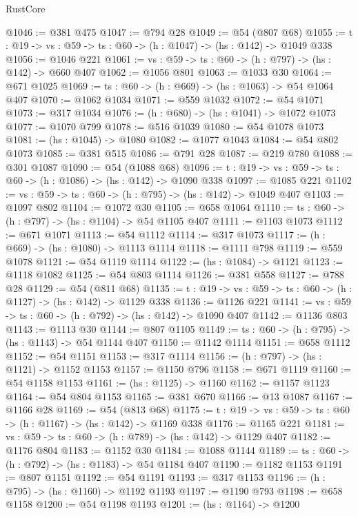 \begin{lexlean}{RustCore}
\begin{coremodule}
@1046 := @381 @475
@1047 := @794 @28
@1049 := @54 (@807 @68)
@1055 := {t : @19} -> {vs : @59} -> {ts : @60} -> (h : @1047) -> (hs : @142) -> @1049 @338
@1056 := @1046 @221
@1061 := {vs : @59} -> {ts : @60} -> (h : @797) -> (hs : @142) -> @660 @407
@1062 := @1056 @801
@1063 := @1033 @30
@1064 := @671 @1025
@1069 := {ts : @60} -> (h : @669) -> (hs : @1063) -> @54 @1064 @407
@1070 := @1062 @1034
@1071 := @559 @1032
@1072 := @54 @1071
@1073 := @317 @1034
@1076 := (h : @680) -> (hs : @1041) -> @1072 @1073
@1077 := @1070 @799
@1078 := @516 @1039
@1080 := @54 @1078 @1073
@1081 := (hs : @1045) -> @1080
@1082 := @1077 @1043
@1084 := @54 @802 @1073
@1085 := @381 @515
@1086 := @791 @28
@1087 := @219 @780
@1088 := @301 @1087
@1090 := @54 (@1088 @68)
@1096 := {t : @19} -> {vs : @59} -> {ts : @60} -> (h : @1086) -> (hs : @142) -> @1090 @338
@1097 := @1085 @221
@1102 := {vs : @59} -> {ts : @60} -> (h : @795) -> (hs : @142) -> @1049 @407
@1103 := @1097 @802
@1104 := @1072 @30
@1105 := @658 @1064
@1110 := {ts : @60} -> (h : @797) -> (hs : @1104) -> @54 @1105 @407
@1111 := @1103 @1073
@1112 := @671 @1071
@1113 := @54 @1112
@1114 := @317 @1073
@1117 := (h : @669) -> (hs : @1080) -> @1113 @1114
@1118 := @1111 @798
@1119 := @559 @1078
@1121 := @54 @1119 @1114
@1122 := (hs : @1084) -> @1121
@1123 := @1118 @1082
@1125 := @54 @803 @1114
@1126 := @381 @558
@1127 := @788 @28
@1129 := @54 (@811 @68)
@1135 := {t : @19} -> {vs : @59} -> {ts : @60} -> (h : @1127) -> (hs : @142) -> @1129 @338
@1136 := @1126 @221
@1141 := {vs : @59} -> {ts : @60} -> (h : @792) -> (hs : @142) -> @1090 @407
@1142 := @1136 @803
@1143 := @1113 @30
@1144 := @807 @1105
@1149 := {ts : @60} -> (h : @795) -> (hs : @1143) -> @54 @1144 @407
@1150 := @1142 @1114
@1151 := @658 @1112
@1152 := @54 @1151
@1153 := @317 @1114
@1156 := (h : @797) -> (hs : @1121) -> @1152 @1153
@1157 := @1150 @796
@1158 := @671 @1119
@1160 := @54 @1158 @1153
@1161 := (hs : @1125) -> @1160
@1162 := @1157 @1123
@1164 := @54 @804 @1153
@1165 := @381 @670
@1166 := @13 @1087
@1167 := @1166 @28
@1169 := @54 (@813 @68)
@1175 := {t : @19} -> {vs : @59} -> {ts : @60} -> (h : @1167) -> (hs : @142) -> @1169 @338
@1176 := @1165 @221
@1181 := {vs : @59} -> {ts : @60} -> (h : @789) -> (hs : @142) -> @1129 @407
@1182 := @1176 @804
@1183 := @1152 @30
@1184 := @1088 @1144
@1189 := {ts : @60} -> (h : @792) -> (hs : @1183) -> @54 @1184 @407
@1190 := @1182 @1153
@1191 := @807 @1151
@1192 := @54 @1191
@1193 := @317 @1153
@1196 := (h : @795) -> (hs : @1160) -> @1192 @1193
@1197 := @1190 @793
@1198 := @658 @1158
@1200 := @54 @1198 @1193
@1201 := (hs : @1164) -> @1200

\end{coremodule}
\end{lexlean}
